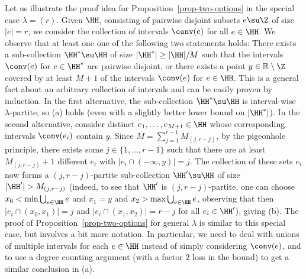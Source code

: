 Let us illustrate the proof idea for Proposition~\ref{prop-two-options} in the special case $\lambda = (r)$. Given $\HH$, consisting of pairwise disjoint subsets $e\su \Z$ of size $|e|=r$, we consider the collection of intervals $\conv(e)$ for all $e \in \HH$. We observe that at least one one of the following two statements holds: There exists a sub-collection $\HH^*\su \HH$ of size $|\HH^*|\ge |\HH|/M$ such that the intervals $\conv(e)$ for $e\in \HH^*$ are pairwise disjoint, or there exists a point $y \in \mathbb R\setminus \Z$ covered by at least $M+1$ of the intervals $\conv(e)$ for $e\in \HH$. This is a general fact about an arbitrary collection of intervals and can be easily proven by induction. In the first alternative, the sub-collection $\HH^*\su \HH$ is interval-wise $\lambda$-partite, so (a) holds (even with a slightly better lower bound on $|\HH^*|$). In the second alternative, consider distinct $e_1, \ldots, e_{M+1}\in \HH$ whose corresponding intervals $\conv(e_i)$ contain $y$. Since $M = \sum_{j=1}^{r-1} M_{(j, r-j)}$, by the pigeonhole principle, there exists some $j \in \{1, \ldots, r-1\}$ such that there are at least $M_{(j, r-j)}+1$ different $e_i$ with $|e_i \cap (-\infty, y)| = j$. The collection of these sets $e_i$ now forms a $(j, r-j)$-partite sub-collection $\HH'\su \HH$ of size $|\HH'|>M_{(j, r-j)}$ (indeed, to see that $\HH'$ is $(j, r-j)$-partite, one can choose $x_0<\min \bigcup_{e\in \HH} e$ and $x_1=y$ and $x_2>\max \bigcup_{e\in \HH} e$, observing that then $|e_i \cap (x_0, x_1)| = j$ and $|e_i \cap (x_1, x_2)| = r-j$ for all $e_i\in \HH'$), giving (b). The proof of Proposition~\ref{prop-two-options} for general $\lambda$ is similar to this special case, but involves a bit more notation.  In particular, we need to deal with unions of multiple intervals for each $e\in \HH$ instead of simply considering $\conv(e)$, and to use a degree counting argument (with a factor $2$ loss in the bound) to get a similar conclusion in (a).

